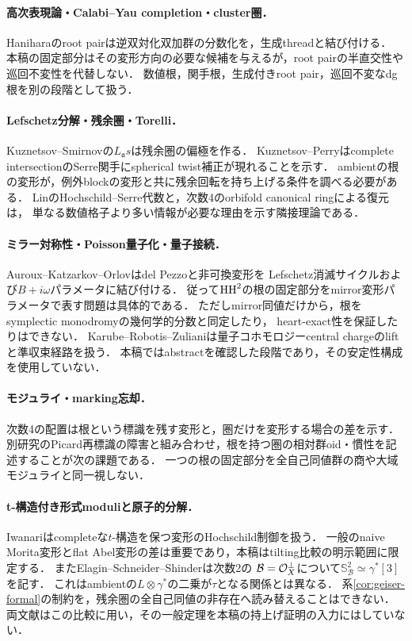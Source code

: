\paragraph{高次表現論・Calabi--Yau completion・cluster圏．}
Haniharaのroot pairは逆双対化双加群の分数化を，生成threadと結び付ける\cite{Hanihara}．
本稿の固定部分はその変形方向の必要な候補を与えるが，root pairの半直交性や巡回不変性を代替しない．
数値根，関手根，生成付きroot pair，巡回不変なdg根を別の段階として扱う．

\paragraph{Lefschetz分解・残余圏・Torelli．}
Kuznetsov--Smirnovの$L_{\mathfrak a}s$は残余圏の偏極を作る\cite{KS}．
Kuznetsov--Perry\cite{KP}はcomplete intersectionのSerre関手にspherical twist補正が現れることを示す．
ambientの根の変形が，例外blockの変形と共に残余回転を持ち上げる条件を調べる必要がある．
LinのHochschild--Serre代数と，次数4のorbifold canonical ringによる復元\cite{Lin,LRZ}は，
単なる数値格子より多い情報が必要な理由を示す隣接理論である．

\paragraph{ミラー対称性・Poisson量子化・量子接続．}
Auroux--Katzarkov--Orlov\cite[Theorems 1.4, 1.6]{AKO}はdel Pezzoと非可換変形を
Lefschetz消滅サイクルおよび$B+i\omega$パラメータに結び付ける．
従って$\operatorname{HH}^2$の根の固定部分をmirror変形パラメータで表す問題は具体的である．
ただしmirror同値だけから，根をsymplectic monodromyの幾何学的分数と同定したり，
heart-exact性を保証したりはできない．
Karube--Robotis--Zuliani\cite{KRZ}は量子コホモロジーcentral chargeのliftと準収束経路を扱う．
本稿ではabstractを確認した段階であり，その安定性構成を使用していない．

\paragraph{モジュライ・marking忘却．}
次数4の配置は根という標識を残す変形と，圏だけを変形する場合の差を示す．
別研究\cite{Marking}のPicard再標識の障害と組み合わせ，根を持つ圏の相対群oid・慣性を記述することが次の課題である．
一つの根の固定部分を全自己同値群の商や大域モジュライと同一視しない．

\paragraph{t-構造付き形式moduliと原子的分解．}
Iwanari\cite[Theorems 4.5, 4.9, 4.12]{Iwanari}はcompleteな$t$-構造を保つ変形のHochschild制御を扱う．
一般のnaive Morita変形とflat Abel変形の差は重要であり，本稿はtilting比較の明示範囲に限定する．
またElagin--Schneider--Shinder\cite[Lemma 3.17]{ESS}は次数2の
$\mathcal B=\mathcal O_X^\perp$について$\mathbb S_{\mathcal B}^2\simeq\gamma^*[3]$を記す．
これはambientの$L\otimes\gamma^*$の二乗が$\tau$となる関係とは異なる．
系\ref{cor:geiser-formal}の制約を，残余圏の全自己同値の非存在へ読み替えることはできない．
両文献はこの比較に用い，その一般定理を本稿の持上げ証明の入力にはしていない．

